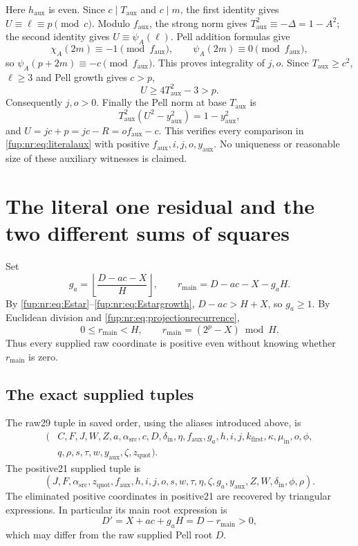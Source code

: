 \documentclass[11pt,letterpaper]{article}
\theoremstyle{definition}\newtheorem{definition}[theorem]{Definition}
\theoremstyle{remark}\newtheorem{remark}[theorem]{Remark}
\newcommand{\Taux}{T_{\mathrm{aux}}}\newcommand{\yaux}{y_{\mathrm{aux}}}
\newcommand{\zquot}{z_{\mathrm{quot}}}\newcommand{\ga}{g_a}
\newcommand{\faux}{f_{\mathrm{aux}}}\newcommand{\rmain}{r_{\mathrm{main}}}\newcommand{\acent}{\mathcal F}
\begin{document}
Here $h_{\mathrm{aux}}$ is even. Since $c\mid\Taux$ and $c\mid m$, the first identity gives $U\equiv\ell\equiv p\pmod c$. Modulo $\faux$, the strong norm gives $\Taux^2\equiv-\Delta=1-A^2$; the second identity gives $U\equiv\psi_A(\ell)$. Pell addition formulas give
\[
 \chi_A(2m)\equiv-1\pmod{\faux},\qquad
 \psi_A(2m)\equiv0\pmod{\faux},
\]
so $\psi_A(p+2m)\equiv-c\pmod{\faux}$. This proves integrality of $j,o$. Since $\Taux\ge c^2$, $\ell\ge3$ and Pell growth gives $c>p$,
\[
 U\ge4\Taux^2-3>p.
\]
Consequently $j,o>0$. Finally the Pell norm at base $\Taux$ is
\[
 \Taux^2(U^2-\yaux^2)=1-\yaux^2,
\]
and $U=jc+p=jc-R=o\faux-c$. This verifies every comparison in \eqref{fup:nr:eq:literalaux} with positive $\faux,i,j,o,\yaux$. No uniqueness or reasonable size of these auxiliary witnesses is claimed.

\section{The literal one residual and the two different sums of squares}\label{fup:nr:sec:residual}
Set
\begin{equation}\label{fup:nr:eq:residue}
 \ga=\left\lfloor\frac{D-ac-X}{H}\right\rfloor,\qquad
 \rmain=D-ac-X-\ga H.
\end{equation}
By \eqref{fup:nr:eq:Estar}--\eqref{fup:nr:eq:Estargrowth}, $D-ac>H+X$, so $\ga\ge1$. By Euclidean division and \eqref{fup:nr:eq:projectionrecurrence},
\begin{equation}\label{fup:nr:eq:mainres}
 0\le\rmain<H,\qquad \rmain=(2^p-X)\bmod H.
\end{equation}
Thus every supplied raw coordinate is positive even without knowing whether $\rmain$ is zero.

\subsection{The exact supplied tuples}
The raw29 tuple in saved order, using the aliases introduced above, is
\begin{align*}
 (&C,F,J,W,Z,a,\alpha_{\mathrm{src}},c,D,\delta_{\mathrm{in}},\eta,\faux,\ga,h,i,j,
 k_{\mathrm{first}},\kappa,\mu_{\mathrm{in}},o,\phi,\\
 &q,\rho,s,\tau,w,\yaux,\zeta,\zquot).
\end{align*}
The positive21 supplied tuple is
\[
 (J,F,\alpha_{\mathrm{src}},\zquot,\faux,h,i,j,o,s,w,\tau,\eta,\zeta,
 \ga,\yaux,Z,W,\delta_{\mathrm{in}},\phi,\rho).
\]
The eliminated positive coordinates in positive21 are recovered by triangular expressions. In particular its main root expression is
\begin{equation}\label{fup:nr:eq:Dprime}
 D'=X+ac+\ga H=D-\rmain>0,
\end{equation}
which may differ from the raw supplied Pell root $D$.
\end{document}
